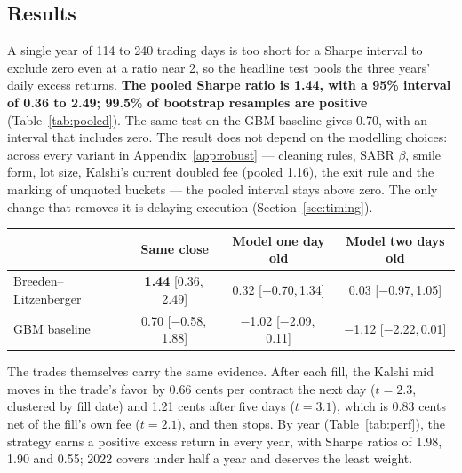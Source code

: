 \documentclass{article}
\begin{document}
\subsection{Results}
A single year of 114 to 240 trading days is too short for a Sharpe interval to exclude zero even at a ratio near 2, so the headline test pools the three years' daily excess returns. \textbf{The pooled Sharpe ratio is 1.44, with a 95\% interval of 0.36 to 2.49; 99.5\% of bootstrap resamples are positive} (Table~\ref{tab:pooled}). The same test on the GBM baseline gives 0.70, with an interval that includes zero. The result does not depend on the modelling choices: across every variant in Appendix~\ref{app:robust} --- cleaning rules, SABR $\beta$, smile form, lot size, Kalshi's current doubled fee (pooled 1.16), the exit rule and the marking of unquoted buckets --- the pooled interval stays above zero. The only change that removes it is delaying execution (Section~\ref{sec:timing}).

\begin{center}
\begin{tabular}{l|c|c|c}
    & Same close & Model one day old & Model two days old \\
    \hline
    Breeden--Litzenberger & \textbf{1.44} [0.36,\,2.49] & 0.32 [$-$0.70,\,1.34] & 0.03 [$-$0.97,\,1.05] \\
    GBM baseline & 0.70 [$-$0.58,\,1.88] & $-$1.02 [$-$2.09,\,0.11] & $-$1.12 [$-$2.22,\,0.01] \\
\end{tabular}
\label{tab:pooled}
\end{center}

The trades themselves carry the same evidence. After each fill, the Kalshi mid moves in the trade's favor by 0.66 cents per contract the next day ($t = 2.3$, clustered by fill date) and 1.21 cents after five days ($t = 3.1$), which is 0.83 cents net of the fill's own fee ($t = 2.1$), and then stops. By year (Table~\ref{tab:perf}), the strategy earns a positive excess return in every year, with Sharpe ratios of 1.98, 1.90 and 0.55; 2022 covers under half a year and deserves the least weight.
\end{document}
